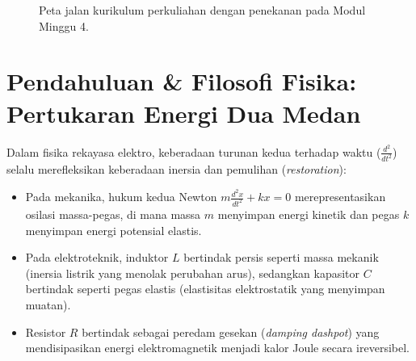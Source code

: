\documentclass[11pt,a4paper]{article}
\theoremstyle{definition}
\begin{document}
\begin{figure}[htbp]
{%
}
\caption{Peta jalan kurikulum perkuliahan dengan penekanan pada Modul Minggu 4.}
\label{fig:peta_jalan_pd_w4}
\end{figure}

\section{Pendahuluan \& Filosofi Fisika: Pertukaran Energi Dua Medan}

Dalam fisika rekayasa elektro, keberadaan turunan kedua terhadap waktu ($\frac{d^2}{dt^2}$) selalu merefleksikan keberadaan inersia dan pemulihan (\textit{restoration}):
\begin{itemize}[leftmargin=*]
    \item Pada mekanika, hukum kedua Newton $m \frac{d^2x}{dt^2} + k x = 0$ merepresentasikan osilasi massa-pegas, di mana massa $m$ menyimpan energi kinetik dan pegas $k$ menyimpan energi potensial elastis.
    \item Pada elektroteknik, induktor $L$ bertindak persis seperti massa mekanik (inersia listrik yang menolak perubahan arus), sedangkan kapasitor $C$ bertindak seperti pegas elastis (elastisitas elektrostatik yang menyimpan muatan).
    \item Resistor $R$ bertindak sebagai peredam gesekan (\textit{damping dashpot}) yang mendisipasikan energi elektromagnetik menjadi kalor Joule secara ireversibel.
\end{itemize}
\end{document}
